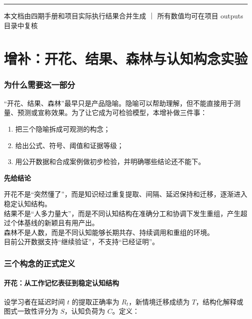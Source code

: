 \documentclass[UTF8,a4paper,11pt]{ctexart}
\newenvironment{explainbox}[1]
{\begin{center}\begin{minipage}{0.94\textwidth}\colorbox{boxbg}{\parbox{0.92\textwidth}{\textbf{#1}\par\vspace{2pt}}}}
{\end{minipage}\end{center}}
\begin{document}
\vspace{12pt}
\hrule
\vspace{6pt}
\begin{center}
\small 本文档由四期手册和项目实际执行结果合并生成 ｜
所有数值均可在项目 outputs 目录中复核
\end{center}





\part{增补：开花、结果、森林与认知构念实验}

\section{为什么需要这一部分}

“开花、结果、森林”最早只是产品隐喻。隐喻可以帮助理解，但不能直接用于测量、预测或宣称效果。为了让它成为可检验模型，本增补做三件事：

\begin{enumerate}[leftmargin=2em]
\item 把三个隐喻拆成可观测的构念；
\item 给出公式、符号、阈值和证据等级；
\item 用公开数据和合成案例做初步检验，并明确哪些结论还不能下。
\end{enumerate}

\begin{explainbox}{先给结论}
开花不是“突然懂了”，而是知识经过重复提取、间隔、延迟保持和迁移，逐渐进入稳定认知结构。\\
结果不是“人多力量大”，而是不同认知结构在准确分工和协调下发生重组，产生超过个体基线的新颖且有用产出。\\
森林不是人数，而是不同认知能够长期共存、持续调用和重组的环境。\\
目前公开数据支持“继续验证”，不支持“已经证明”。
\end{explainbox}

\section{三个构念的正式定义}

\subsection{开花：从工作记忆表征到稳定认知结构}

设学习者在延迟时间 $t$ 的提取正确率为 $R_t$，新情境迁移成绩为 $T$，结构化解释或图式一致性评分为 $S$，认知负荷为 $C$。定义：
\end{document}
